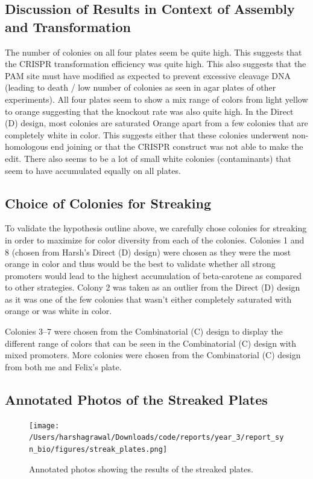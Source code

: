 \documentclass[12pt,a4paper]{article}
\begin{document}
\subsection{Discussion of Results in Context of Assembly and Transformation}
The number of colonies on all four plates seem be quite high. This suggests
that the CRISPR transformation efficiency was quite high. This also suggests
that the PAM site must have modified as expected to prevent excessive cleavage
DNA (leading to death / low number of colonies as seen in agar plates of other
experiments). All four plates seem to show a mix range of colors from light
yellow to orange suggesting that the knockout rate was also quite high. In the
Direct (D) design, most colonies are saturated Orange apart from a few colonies
that are completely white in color. This suggests either that these colonies
underwent non-homologous end joining or that the CRISPR construct was not able
to make the edit. There also seems to be a lot of small white colonies
(contaminants) that seem to have accumulated equally on all plates.

\subsection{Choice of Colonies for Streaking}
To validate the hypothesis outline above, we carefully chose colonies for
streaking in order to maximize for color diversity from each of the colonies.
Colonies 1 and 8 (chosen from Harsh's Direct (D) design) were chosen as they
were the most orange in color and thus would be the best to validate whether
all strong promoters would lead to the highest accumulation of beta-carotene as
compared to other strategies. Colony 2 was taken as an outlier from the Direct
(D) design as it was one of the few colonies that wasn't either completely
saturated with orange or was white in color.

Colonies 3--7 were chosen from the Combinatorial (C) design to display the
different range of colors that can be seen in the Combinatorial (C) design with
mixed promoters. More colonies were chosen from the Combinatorial (C) design
from both me and Felix's plate.

\subsection{Annotated Photos of the Streaked Plates}
\begin{figure}[h]
    \centering
    \texttt{[image: /Users/harshagrawal/Downloads/code/reports/year\_3/report\_syn\_bio/figures/streak\_plates.png]}
    \caption{Annotated photos showing the results of the streaked plates.}\label{fig:streaked_plates}
\end{figure}
\end{document}
